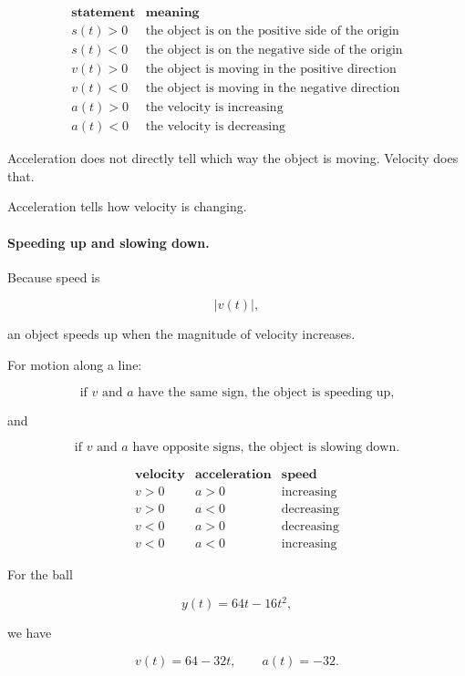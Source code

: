 \[
\begin{array}{c|l}
\textbf{statement} & \textbf{meaning} \\ \hline
s(t)>0 & \text{the object is on the positive side of the origin} \\[2pt]
s(t)<0 & \text{the object is on the negative side of the origin} \\[2pt]
v(t)>0 & \text{the object is moving in the positive direction} \\[2pt]
v(t)<0 & \text{the object is moving in the negative direction} \\[2pt]
a(t)>0 & \text{the velocity is increasing} \\[2pt]
a(t)<0 & \text{the velocity is decreasing}
\end{array}
\]

Acceleration does not directly tell which way the object is moving.  Velocity does that.

Acceleration tells how velocity is changing.

\paragraph{Speeding up and slowing down.}
Because speed is

\[
|v(t)|,
\]

an object speeds up when the magnitude of velocity increases.

For motion along a line:

\[
\boxed{
\text{if \(v\) and \(a\) have the same sign, the object is speeding up,}
}
\]

and

\[
\boxed{
\text{if \(v\) and \(a\) have opposite signs, the object is slowing down.}
}
\]

\[
\begin{array}{c|c|c}
\textbf{velocity} & \textbf{acceleration} & \textbf{speed} \\ \hline
v>0 & a>0 & \text{increasing} \\[2pt]
v>0 & a<0 & \text{decreasing} \\[2pt]
v<0 & a>0 & \text{decreasing} \\[2pt]
v<0 & a<0 & \text{increasing}
\end{array}
\]

For the ball

\[
y(t)=64t-16t^2,
\]

we have

\[
v(t)=64-32t,
\qquad
a(t)=-32.
\]

